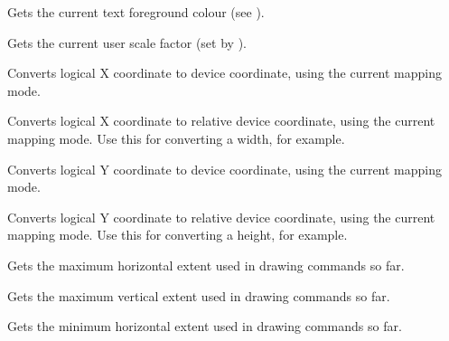 Gets the current text foreground colour (see ).


\label{wxdcgetuserscale}


Gets the current user scale factor (set by ).


\label{wxdclogicaltodevicex}


Converts logical X coordinate to device coordinate, using the current
mapping mode.

\label{wxdclogicaltodevicexrel}


Converts logical X coordinate to relative device coordinate, using the current
mapping mode. Use this for converting a width, for example.

\label{wxdclogicaltodevicey}


Converts logical Y coordinate to device coordinate, using the current
mapping mode.

\label{wxdclogicaltodeviceyrel}


Converts logical Y coordinate to relative device coordinate, using the current
mapping mode. Use this for converting a height, for example.

\label{wxdcmaxx}


Gets the maximum horizontal extent used in drawing commands so far.

\label{wxdcmaxy}


Gets the maximum vertical extent used in drawing commands so far.

\label{wxdcminx}


Gets the minimum horizontal extent used in drawing commands so far.

